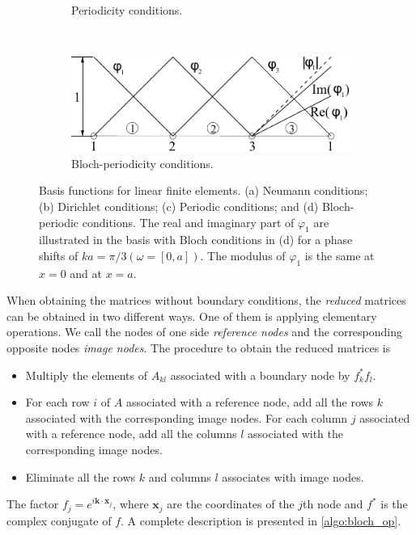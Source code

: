 \begin{figure}[H]
\begin{subfigure}[b]{0.4\textwidth}
		\caption{Periodicity conditions.}
	\end{subfigure}\,
%
	\begin{subfigure}[b]{0.4\textwidth}\qquad
		\includegraphics[width=\textwidth]{periodic-interpolation-d.pdf}
		\caption{Bloch-periodicity conditions.}
	\end{subfigure}
\caption{Basis functions for linear finite elements.
 (a) Neumann conditions; (b) Dirichlet conditions; (c) Periodic conditions; and (d) Bloch-periodic conditions. The real and imaginary part of $\varphi_1$ are illustrated in the basis with Bloch conditions in (d) for a phase shifts of $ka=\pi/3 (\omega=[0,a])$. The modulus of $\varphi_1$ is the same at $x=0$ and at $x=a$.}
\label{fig:bloch_interp}
\end{figure}
When obtaining the matrices without boundary conditions, the \emph{reduced} matrices can be obtained in two different ways. One of them is applying elementary operations. We call the nodes of one side  \emph{reference nodes} and the corresponding opposite nodes \emph{image nodes}. The procedure to obtain the reduced matrices is \cite{sukumar_bloch-2009, MSc_thesis-Guarin2012}
\begin{itemize}
\item Multiply the elements of $A_{kl}$ associated with a boundary node by $f_k^{*}f_l$.
\item For each row $i$ of $A$ associated with a reference node, add all the rows $k$ associated with the corresponding image nodes. For each column $j$ associated with a reference node, add all the columns $l$ associated with the corresponding image nodes.
\item Eliminate all the rows $k$ and columns $l$ associates with image nodes.
\end{itemize}
The factor $f_j=e^{i\mathbf{k}\cdot \mathbf{x}_j}$, where $\mathbf{x}_j$ are the coordinates of the $j$th node and $f^{*}$ is the complex conjugate of $f$. A complete  description is presented in \cref{algo:bloch_op}.

